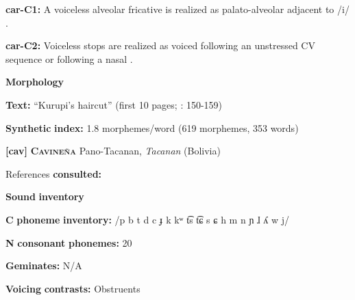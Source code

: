 \begin{styleBody}
\textbf{car-C1:} A voiceless alveolar fricative is realized as palato-alveolar adjacent to /i/ \citep[32]{Courtz2008}.
\end{styleBody}

\begin{styleBody}
\textbf{car-C2:} Voiceless stops are realized as voiced following an unstressed CV sequence or following a nasal \citep[31]{Courtz2008}.
\end{styleBody}

\begin{styleBody}
\textbf{Morphology}
\end{styleBody}

\begin{styleBody}
\textbf{Text:} “Kurupi’s haircut” (first 10 pages; \citealt{Courtz2008}: 150-159)
\end{styleBody}

\begin{styleBody}
\textbf{Synthetic} \textbf{index:} 1.8 morphemes/word (619 morphemes, 353 words)
\end{styleBody}

\begin{styleBody}
\textbf{[cav]}   \textbf{\textsc{Cavineña}  }  Pano-Tacanan, \textit{Tacanan} (Bolivia)
\end{styleBody}

\begin{styleBody}
References \textbf{consulted:} \citet{Guillaume2008}
\end{styleBody}

\begin{styleBody}
\textbf{Sound} \textbf{inventory}
\end{styleBody}

\begin{styleBody}
\textbf{C} \textbf{phoneme} \textbf{inventory:} /p b t d c ɟ k kʷ t͡s t͡ɕ s ɕ h m n ɲ ɺ ʎ w j/
\end{styleBody}

\begin{styleBody}
\textbf{N} \textbf{consonant} \textbf{phonemes:} 20
\end{styleBody}

\begin{styleBody}
\textbf{Geminates:} N/A
\end{styleBody}

\begin{styleBody}
\textbf{Voicing} \textbf{contrasts:} Obstruents
\end{styleBody}


